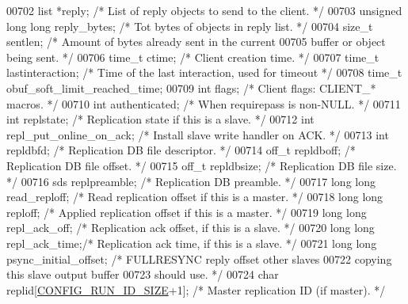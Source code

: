 \begin{DoxyCode}
{{{{{{00702     list *reply;            \textcolor{comment}{/* List of reply objects to send to the client. */}
00703     \textcolor{keywordtype}{unsigned} \textcolor{keywordtype}{long} \textcolor{keywordtype}{long} reply\_bytes; \textcolor{comment}{/* Tot bytes of objects in reply list. */}
00704     size\_t sentlen;         \textcolor{comment}{/* Amount of bytes already sent in the current}
00705 \textcolor{comment}{                               buffer or object being sent. */}
00706     time\_t ctime;           \textcolor{comment}{/* Client creation time. */}
00707     time\_t lastinteraction; \textcolor{comment}{/* Time of the last interaction, used for timeout */}
00708     time\_t obuf\_soft\_limit\_reached\_time;
00709     \textcolor{keywordtype}{int} flags;              \textcolor{comment}{/* Client flags: CLIENT\_* macros. */}
00710     \textcolor{keywordtype}{int} authenticated;      \textcolor{comment}{/* When requirepass is non-NULL. */}
00711     \textcolor{keywordtype}{int} replstate;          \textcolor{comment}{/* Replication state if this is a slave. */}
00712     \textcolor{keywordtype}{int} repl\_put\_online\_on\_ack; \textcolor{comment}{/* Install slave write handler on ACK. */}
00713     \textcolor{keywordtype}{int} repldbfd;           \textcolor{comment}{/* Replication DB file descriptor. */}
00714     off\_t repldboff;        \textcolor{comment}{/* Replication DB file offset. */}
00715     off\_t repldbsize;       \textcolor{comment}{/* Replication DB file size. */}
00716     sds replpreamble;       \textcolor{comment}{/* Replication DB preamble. */}
00717     \textcolor{keywordtype}{long} \textcolor{keywordtype}{long} read\_reploff; \textcolor{comment}{/* Read replication offset if this is a master. */}
00718     \textcolor{keywordtype}{long} \textcolor{keywordtype}{long} reploff;      \textcolor{comment}{/* Applied replication offset if this is a master. */}
00719     \textcolor{keywordtype}{long} \textcolor{keywordtype}{long} repl\_ack\_off; \textcolor{comment}{/* Replication ack offset, if this is a slave. */}
00720     \textcolor{keywordtype}{long} \textcolor{keywordtype}{long} repl\_ack\_time;\textcolor{comment}{/* Replication ack time, if this is a slave. */}
00721     \textcolor{keywordtype}{long} \textcolor{keywordtype}{long} psync\_initial\_offset; \textcolor{comment}{/* FULLRESYNC reply offset other slaves}
00722 \textcolor{comment}{                                       copying this slave output buffer}
00723 \textcolor{comment}{                                       should use. */}
00724     \textcolor{keywordtype}{char} replid[\hyperlink{server_8h_aba6794fa3ee28f85165eaed93190f1df}{CONFIG\_RUN\_ID\_SIZE}+1]; \textcolor{comment}{/* Master replication ID (if master). */}
}}}}}}
\end{DoxyCode}
